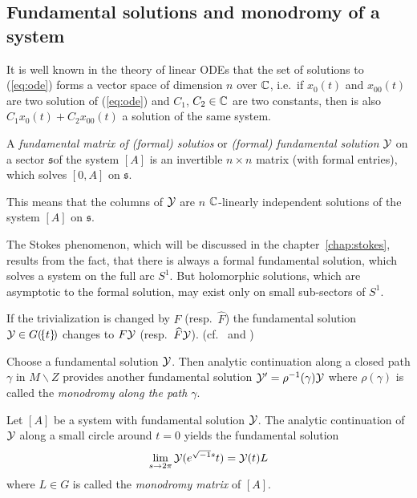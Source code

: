 \subsection{Fundamental solutions and monodromy of a system}
It is well known in the theory of linear ODEs that the set of solutions to
(\ref{eq:ode}) forms a vector space of dimension $n$ over $\mathbb{C}$, i.e.\ if
$x_0(t)$ and $x_{00}(t)$ are two solution of (\ref{eq:ode}) and $C_1$,
$C_2\in\mathbb{C}$ are two constants, then is also $C_1x_0(t)+C_2x_{00}(t)$ a solution
of the same system.
\begin{defn}
  A \emph{fundamental matrix of (formal) solutios} or \emph{(formal)
  fundamental solution} $\mathcal{Y}$ on a sector $\mathfrak{s} $\PROBLEM[?] of the
  system $[A]$ is an invertible $n\times n$ matrix (with formal entries), which
  solves $[0,A]$ on $\mathfrak{s}$.
  \begin{s-rem}
    This means that the columns of $\mathcal{Y}$ are $n$ $\mathbb{C}$-linearly independent
    solutions of the system $[A]$ on $\mathfrak{s}$.
  \end{s-rem}
\end{defn}
The Stokes phenomenon, which will be discussed in the
chapter~\ref{chap:stokes}, results from the fact, that there is always a formal
fundamental solution, which solves a system on the full arc $S^1$.
But holomorphic solutions, which are asymptotic to the formal solution, may
exist only on small sub-sectors of $S^1$.
\begin{rem}
  If the trivialization is changed by $F$ (resp.\ $\hat F$) the fundamental
  solution $\mathcal{Y}\in G(\!\{t\}\!)$ changes to $F\mathcal{Y}$ (resp.\ $\widehat F\mathcal{Y}$).
  (cf.\ \cite[Thm.4.3.1]{Loday2014} and \cite[2.1.3]{Zein2009})
\end{rem}

Choose a fundamental solution $\mathcal{Y}$. Then analytic continuation along a closed
path $\gamma$ in $M\backslash Z$ provides another fundamental solution
$\mathcal{Y}'=\rho^{-1}(\gamma)\mathcal{Y}$ where $\rho(\gamma)$ is called the \emph{monodromy
along the path $\gamma$}.
\begin{defn}
  Let $[A]$ be a system with fundamental solution $\mathcal{Y}$.
  The analytic continuation of $\mathcal{Y}$ along a small circle around $t=0$ yields
  the fundamental solution
  \[
    \lim_{s\to2\pi}\mathcal{Y}(e^{\sqrt{-1}s}t)=\mathcal{Y}(t)L
  \]
  where $L\in G$ is called the \emph{\TODO[(formal)?]monodromy matrix} of $[A]$.
\end{defn}

